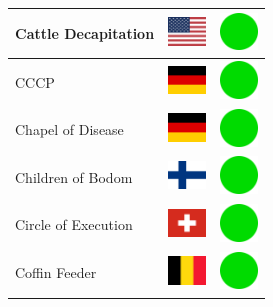 \documentclass[12pt, a4paper, twoside]{report}
\begin{document}
\begin{center}
\begin{longtable}{|p{5cm}|p{2cm}|p{2cm}|}
Cattle Decapitation & \includegraphics[width=1cm]{4x3/us} & \includegraphics[width=1cm]{likes/y} \\ \hline
CCCP & \includegraphics[width=1cm]{4x3/de} & \includegraphics[width=1cm]{likes/y} \\ \hline
Chapel of Disease & \includegraphics[width=1cm]{4x3/de} & \includegraphics[width=1cm]{likes/y} \\ \hline
Children of Bodom & \includegraphics[width=1cm]{4x3/fi} & \includegraphics[width=1cm]{likes/y} \\ \hline
Circle of Execution & \includegraphics[width=1cm]{4x3/ch} & \includegraphics[width=1cm]{likes/y} \\ \hline
Coffin Feeder & \includegraphics[width=1cm]{4x3/be} & \includegraphics[width=1cm]{likes/y} \\ \hline

\end{longtable}
\end{center}
\end{document}
